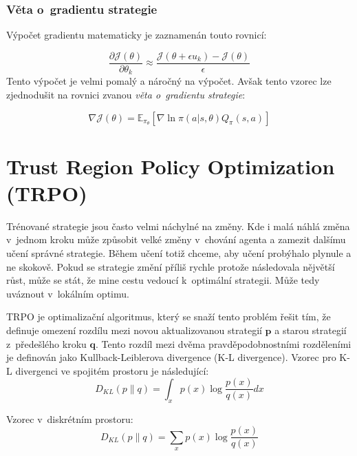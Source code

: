 \subsubsection*{Věta o~gradientu strategie}
Výpočet gradientu matematicky je zaznamenán touto rovnicí:

\begin{equation}
  \label{eq:gradient_strategie}
  \frac{\partial \mathcal{J}(\theta)}{\partial \theta_k} \approx \frac{\mathcal{J}(\theta + \epsilon u_k) - \mathcal{J}(\theta)}{\epsilon}
\end{equation}
Tento výpočet je velmi pomalý a náročný na výpočet.
Avšak tento vzorec lze zjednodušit na rovnici zvanou \emph{věta o~gradientu strategie}:

\begin{equation}
    \label{eq:veta_o_gradientu_strategie}
  \nabla \mathcal{J}(\theta) = \mathbb{E}_{\pi_\theta} [\nabla \ln \pi(a \vert s, \theta) Q_\pi(s, a)]
\end{equation}


\section{Trust Region Policy Optimization (TRPO)}\label{sec:trust-region-policy-optimization}
Trénované strategie jsou často velmi náchylné na změny.
Kde i malá náhlá změna v~jednom kroku může způsobit velké změny v~chování agenta a zamezit dalšímu učení správné strategie.
Během učení totiž chceme, aby učení probýhalo plynule a ne skokově.
Pokud se strategie změní příliš rychle protože následovala nějvětší růst, může se stát, že mine cestu vedoucí k~optimální strategii.
Může tedy uváznout v~lokálním optimu.

TRPO je optimalizační algoritmus, který se snaží tento problém řešit tím, že definuje omezení rozdílu mezi novou aktualizovanou strategií $\textbf{p}$ a starou strategií z~předešlého kroku $\textbf{q}$.
Tento rozdíl mezi dvěma pravděpodobnostními rozděleními je definován jako Kullback-Leiblerova divergence (K-L divergence)\cite{KL_divergence}.
Vzorec pro K-L divergenci ve spojitém prostoru je následující:
\begin{equation}
  D_{KL}(p \| q) = \int_x p(x) \log \frac{p(x)}{q(x)} dx
\end{equation}

Vzorec v~diskrétním prostoru:
\begin{equation}
  D_{KL}(p \| q) = \sum_x p(x) \log \frac{p(x)}{q(x)}
\end{equation}

